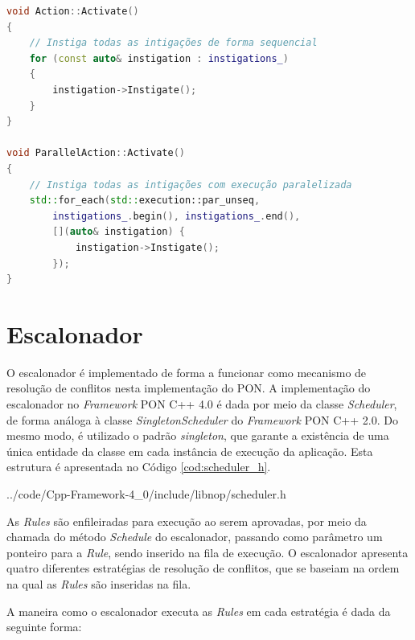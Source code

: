 \begin{lstlisting}[language=C++, float=htb,
caption = {Detalhe de implementação
de paralelização da \textit{Action} no \textit{Framework} PON C++ 4.0},
source = {Autoria própria}, label = {cod:action_cpp}]
void Action::Activate()
{
    // Instiga todas as intigações de forma sequencial
    for (const auto& instigation : instigations_)
    {
        instigation->Instigate();
    }
}

void ParallelAction::Activate()
{
    // Instiga todas as intigações com execução paralelizada
    std::for_each(std::execution::par_unseq,
        instigations_.begin(), instigations_.end(),
        [](auto& instigation) { 
            instigation->Instigate(); 
        });
}
\end{lstlisting}

\FloatBarrier
\section{Escalonador}\label{sec:scheduler}

O escalonador é implementado de forma a funcionar como mecanismo de resolução de
conflitos nesta implementação do PON. A implementação do escalonador no
\textit{Framework} PON C++ 4.0 é dada por meio da classe \textit{Scheduler}, de
forma análoga à classe \textit{SingletonScheduler} do \textit{Framework} PON C++
2.0. Do mesmo modo, é utilizado o padrão \textit{singleton}, que garante a
existência de uma única entidade da classe em cada instância de execução da
aplicação. Esta estrutura é apresentada no Código \ref{cod:scheduler_h}.


            {../code/Cpp-Framework-4_0/include/libnop/scheduler.h}

As \textit{Rules} são enfileiradas para execução ao serem aprovadas, por meio da
chamada do método \textit{Schedule} do escalonador, passando como parâmetro um
ponteiro para a \textit{Rule}, sendo inserido na fila de execução. O escalonador
apresenta quatro diferentes estratégias de resolução de conflitos, que se
baseiam na ordem na qual as \textit{Rules} são inseridas na fila.

\FloatBarrier

A maneira como o escalonador executa as \textit{Rules} em cada estratégia é dada
da seguinte forma:

